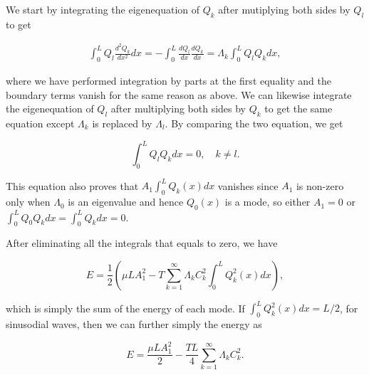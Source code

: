 \documentclass[a4paper,12pt]{report}
\begin{document}
We start by integrating the eigenequation of \(Q_{k} \)  after mutiplying both sides by \(Q_{l} \) to get 

\begin{equation}
	\begin{aligned}
		\int_{0}^{L} Q_{l} \frac{d^2Q_{k} }{dx^2} dx = - \int_{0}^{L} \frac{dQ_{l} }{dx}\frac{dQ_{k} }{dx} = \Lambda _{k} \int_{0}^{L} Q_{l} Q_{k} dx, 
	\end{aligned}
\end{equation}

where we have performed integration by parts at the first equality and the boundary terms vanish for the same reason as above. We can likewise integrate the eigenequation of \(Q_{l} \) after multiplying both sides by \(Q_{k} \) to get the same equation except \(\Lambda _{k} \) is replaced by \(\Lambda _{l} \). By comparing the two equation, we get

\begin{equation}
	\int_{0}^{L} Q_{l} Q_{k} dx =0, \quad k \neq l.   
\end{equation}

This equation also proves that \(A_1 \int_{0}^{L} Q_{k} (x) dx \) vanishes since \(A_1 \) is non-zero only when \(\Lambda _{0} \) is an eigenvalue and hence \(Q_{0}(x) \) is a mode, so either \(A_1 =0\) or \(\int_{0}^{L} Q_{0}Q_{k} dx= \int_{0}^{L} Q_{k} dx = 0  \). 

After eliminating all the integrals that equals to zero, we have 

\begin{equation}
	E = \frac{1}{2} \left( \mu LA_1 ^2 - T \sum_{k=1}^{\infty} \Lambda _{k}C_{k}^2\int_{0}^{L}Q_{k}^2(x) dx       \right),  
\end{equation}

which is simply the sum of the energy of each mode. If \(\int_{0}^{L} Q_{k}^2(x) dx = L /2     \), for sinusodial waves, then we can further simply the energy as 

\begin{equation}
	E = \frac{\mu LA_1 ^2}{2} - \frac{TL}{4}\sum_{k=1}^{\infty}\Lambda _{k}C_{k}^2.     
\end{equation}
\end{document}

